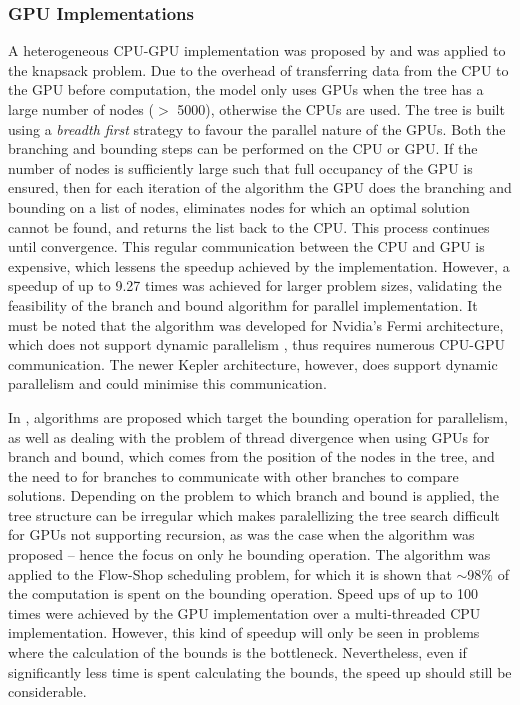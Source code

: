 \documentclass[10pt,a4paer,twocolumn]{article}
\begin{document}
\subsubsection{GPU Implementations } \label{ssec:gpuimp}

A heterogeneous CPU-GPU implementation was proposed by \cite{bouk:2012} and was applied to the knapsack 
problem. Due to the overhead of transferring data from the CPU to the GPU before computation, the model only 
uses GPUs when the tree has a large number of nodes ($>$ 5000), otherwise the CPUs are used. The 
tree is built using a \textit{breadth first} strategy to favour the parallel nature of the GPUs. Both the
branching and bounding steps can be performed on the CPU or GPU. If the number of nodes is sufficiently large
such that full occupancy of the GPU is ensured, then for each iteration of the algorithm the GPU does the
branching and bounding on a list of nodes, eliminates nodes for which an optimal solution cannot be found, and
returns the list back to the CPU. This process continues until convergence. This regular communication between
the CPU and GPU is expensive, which lessens the speedup achieved by the implementation. However, a speedup of 
up to 9.27 times was achieved for larger problem sizes, validating the feasibility of the branch and bound 
algorithm for parallel implementation. It must be noted that the algorithm was developed for Nvidia's Fermi
architecture, which does not support dynamic parallelism \cite{nvidia:2012}, thus requires numerous CPU-GPU 
communication. The newer Kepler architecture, however, does support dynamic parallelism and could minimise
this communication. 

In \cite{melab:2012, chakroun:2012}, algorithms are proposed which target the bounding operation for parallelism,
as well as dealing with the problem of thread divergence when using GPUs for branch and bound, which comes
from the position of the nodes in the tree, and the need to for branches to communicate with other branches to
compare solutions. Depending on the problem to which branch and bound is applied, the tree structure can be
irregular which makes paralellizing the tree search difficult for GPUs not supporting recursion, as was the 
case when the algorithm was proposed -- hence the focus on only he bounding operation. The algorithm was 
applied to the Flow-Shop scheduling problem, for which it is shown that $\mathit{\sim}$98$\%$ of the 
computation is spent on the bounding operation. Speed ups of up to 100 times were achieved by the GPU 
implementation over a multi-threaded CPU implementation. However, this kind of speedup will only be seen in 
problems where the calculation of the bounds is the bottleneck. Nevertheless, even if significantly less 
time is spent calculating the bounds, the speed up should still be considerable.
\end{document}
